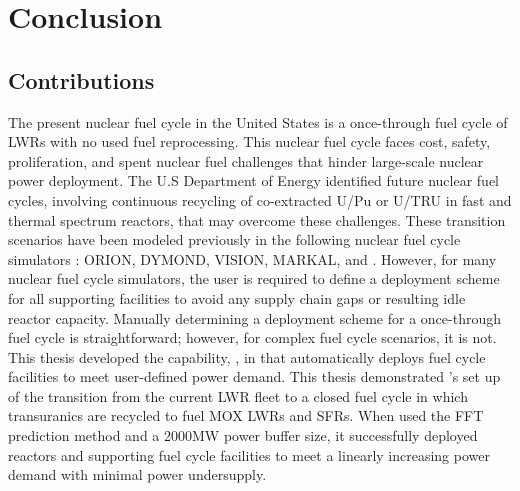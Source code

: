 \chapter{Conclusion}
\section{Contributions}
The present nuclear fuel cycle in the United States is a once-through 
fuel cycle of LWRs with no used fuel reprocessing. 
This nuclear fuel cycle faces cost, safety, proliferation, and spent 
nuclear fuel challenges that hinder large-scale nuclear power deployment. 
The U.S Department of Energy identified future 
nuclear fuel cycles, involving continuous recycling of co-extracted U/Pu or 
U/TRU in fast and thermal spectrum reactors, that may overcome these challenges.
These transition scenarios have been modeled previously in the following 
nuclear fuel cycle simulators \cite{feng_standardized_2016,bae_standardized_2019}: 
ORION, DYMOND, VISION, MARKAL, and \Cyclus. 
However, for many nuclear fuel cycle simulators, the user is required to 
define a deployment scheme for all supporting facilities to avoid any 
supply chain gaps or resulting idle reactor capacity. 
Manually determining a deployment scheme for a once-through 
fuel cycle is straightforward; however, for complex fuel cycle 
scenarios, it is not. 
This thesis developed the capability, \deploy, in \Cyclus that automatically deploys 
fuel cycle facilities to meet user-defined power demand. 
This thesis demonstrated \deploy's set up of the transition from the current 
LWR fleet to a closed fuel cycle in which transuranics are recycled to fuel 
MOX LWRs and SFRs.  
When \deploy used the FFT prediction method and a 2000MW power buffer size, 
it successfully deployed reactors and supporting fuel cycle facilities to 
meet a linearly increasing power demand with minimal power undersupply. 

